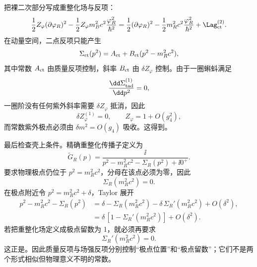 \begin{exbox}
把裸二次部分写成重整化场与反项：
\begin{equation*}
 \frac12 Z_\varphi(\partial\varphi_R)^2
 -\frac12 Z_\varphi m_B^2c^2\frac{\varphi_R^2}{\hbar^2}
 =\frac12(\partial\varphi_R)^2
 -\frac12m_R^2c^2\frac{\varphi_R^2}{\hbar^2}
 +\Lag_{\rm ct}^{(2)}.
\end{equation*}
在动量空间，二点反项只能产生
\begin{equation*}
 \Sigma_{\rm ct}(p^2)
 =A_{\rm ct}+B_{\rm ct}(p^2-m_R^2c^2),
\end{equation*}
其中常数 $A_{\rm ct}$ 由质量反项控制，斜率 $B_{\rm ct}$ 由 $\delta Z_\varphi$ 控制。由于一圈蝌蚪满足
\begin{equation*}
 \frac{\dd\Sigma_{\rm tad}^{(1)}}{\dd p^2}=0,
\end{equation*}
一圈阶没有任何紫外斜率需要 $\delta Z_\varphi$ 抵消，因此
\begin{equation*}
 \delta Z_\varphi^{(1)}=0,
 \qquad
 Z_\varphi=1+O(g_4^2),
\end{equation*}
而常数紫外极点必须由 $\delta m^2=O(g_4)$ 吸收。这得到。

最后检查壳上条件。精确重整化传播子定义为
\begin{equation*}
 \widetilde G_R(p)
 =\frac{\ii}
 {p^2-m_R^2c^2-\Sigma_R(p^2)+\ii0^+}.
\end{equation*}
要求物理极点仍位于 $p^2=m_R^2c^2$，分母在该点必须为零，因此
\begin{equation*}
 \Sigma_R(m_R^2c^2)=0.
\end{equation*}
在极点附近令 $p^2=m_R^2c^2+\delta$，Taylor 展开
\begin{align*}
 p^2-m_R^2c^2-\Sigma_R(p^2)
 &=\delta
 -\Sigma_R(m_R^2c^2)
 -\delta\,\Sigma_R'(m_R^2c^2)
 +O(\delta^2),\\
 &=\delta\,[1-\Sigma_R'(m_R^2c^2)]
 +O(\delta^2).
\end{align*}
若把重整化场定义成极点留数为 1，就必须再要求
\begin{equation*}
 \Sigma_R'(m_R^2c^2)=0.
\end{equation*}
这正是。因此质量反项与场强反项分别控制“极点位置”和“极点留数”；它们不是两个形式相似但物理意义不明的常数。
\end{exbox}

